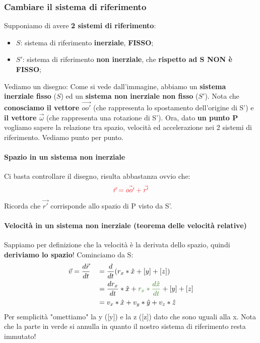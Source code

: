         \subsubsection{Cambiare il sistema di riferimento}
            Supponiamo di avere \textbf{2 sistemi di riferimento}:
            \begin{itemize}
                \item $S$: sistema di riferimento \textbf{inerziale}, \textbf{FISSO};
                \item $S'$: sistema di riferimento \textbf{non inerziale}, che \textbf{rispetto ad S NON è FISSO};
            \end{itemize}
            Vediamo un disegno:
            Come si vede dall'immagine, abbiamo un \textbf{sistema inerziale fisso} ($S$) ed un \textbf{sistema non inerziale non fisso} ($S'$). Nota che \textbf{conosciamo il vettore $\vec{oo'}$} (che rappresenta lo spostamento dell'origine di S') e \textbf{il vettore $\vec{\omega}$} (che rappresenta una rotazione di S'). Ora, dato \textbf{un punto P} vogliamo sapere la relazione tra spazio, velocità ed accelerazione nei 2 sistemi di riferimento. Vediamo punto per punto.

            \paragraph{Spazio in un sistema non inerziale}
                Ci basta controllare il disegno, risulta abbastanza ovvio che:
                \begin{align*}
                    \textcolor{Red}{\vec{r}=\vec{oo'}+\vec{r'}}
                \end{align*}
                Ricorda che $\vec{r'}$ corrisponde allo spazio di P visto da S'.

            \paragraph{Velocità in un sistema non inerziale (teorema delle velocità relative)}
                Sappiamo per definizione che la velocità è la derivata dello spazio, quindi \textbf{deriviamo lo spazio}! Cominciamo da S:
                \begin{align*}
                    & \vec{v}=\frac{d\vec{r}}{dt} &&=\frac{d}{dt}(r_x*\hat{x}+[y]+[z])\\
                    & &&=\frac{dr_x}{dt}*\hat{x}+  \textcolor{OliveGreen}{r_x *\frac{d\hat{x}}{dt}}+[y]+[z]\\
                    & &&=v_x*\hat{x}+v_y*\hat{y}+v_z*\hat{z}
                \end{align*}
                Per semplicità "omettiamo" la y ([y]) e la z ([z]) dato che sono uguali alla x. Nota che \textcolor{OliveGreen}{la parte in verde} si annulla in quanto il nostro sistema di riferimento resta immutato!

